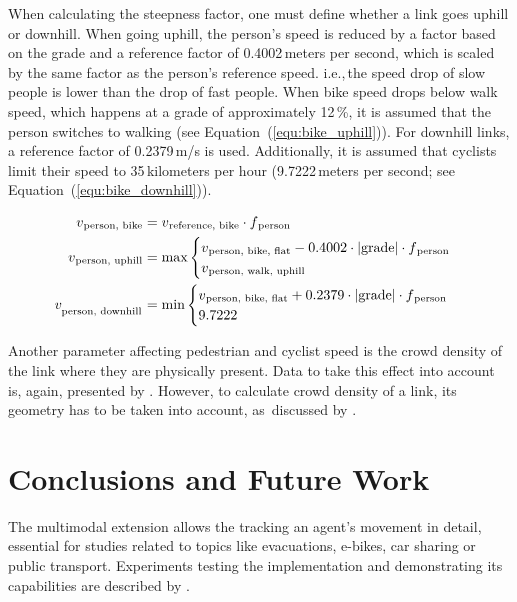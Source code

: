 When calculating the steepness factor, one must define whether a link goes uphill or downhill. When going uphill, the person's speed is reduced by a factor based on the grade and a reference factor of 0.4002\,meters per second, which is scaled by the same factor as the person's reference speed. i.e.,\,the speed drop of slow people is lower than the drop of fast people. When bike speed drops below walk speed, which happens at a grade of approximately 12\,\%, it is assumed that the person switches to walking (see Equation~(\ref{equ:bike_uphill})). For downhill links, a reference factor of 0.2379\,m/s is used. Additionally, it is assumed that cyclists limit their speed to 35\,kilometers per hour (9.7222\,meters per second; see Equation~(\ref{equ:bike_downhill})).

{\fontsize{12.8pt}{12}
\begin{align}
    v\textsubscript{person, bike} &= v\textsubscript{reference, bike} \cdot f\textsubscript{person}\\
    v\textsubscript{person, uphill} &= \text{max}
    \begin{cases}
        v\textsubscript{person, bike, flat} - 0.4002 \cdot |\text{grade}| \cdot f\textsubscript{person}\\
        v\textsubscript{person, walk, uphill}
    \end{cases}\label{equ:bike_uphill}\\
    v_{\textsubscript{person, downhill}} &= \text{min}
    \begin{cases}
        v\textsubscript{person, bike, flat} + 0.2379 \cdot |\text{grade}| \cdot f\textsubscript{person}\\
        9.7222
    \end{cases}\label{equ:bike_downhill}
\end{align}
}%

Another parameter affecting pedestrian and cyclist speed is the crowd density of the link where they are physically present. Data to take this effect into account is, again, presented by \citet{Weidmann_TechRep_IVT_1992}. However, to calculate crowd density of a link, its geometry has to be taken into account, as \,discussed by \citet{Laemmel_PhDThesis_2011}. 

\section{Conclusions and Future Work}
The \gls{multimodal} \gls{extension} allows the tracking an agent's movement in detail, essential for studies related to topics like evacuations, e-bikes, car sharing or public transport. Experiments testing the implementation and demonstrating its capabilities are described by \citet{Dobler_PhDThesis_2013}.

